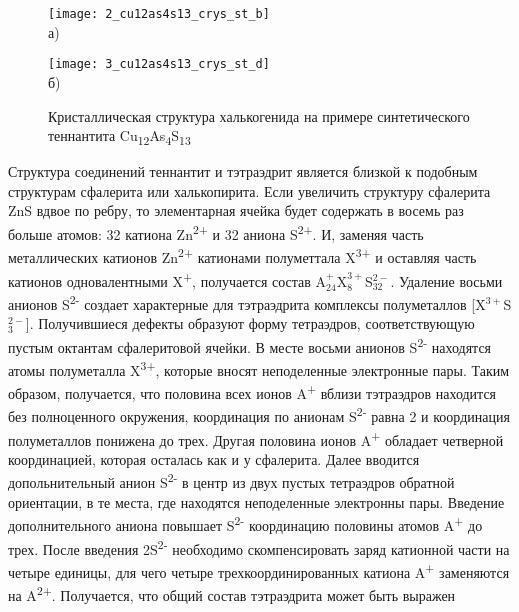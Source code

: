 \begin{figure}[pt!]
  \begin{minipage}[ht]{0.99\linewidth}\centering
    \texttt{[image: 2\_cu12as4s13\_crys\_st\_b]} \\ а)
  \end{minipage}
  \vfill
  \begin{minipage}[ht]{0.99\linewidth}\centering
    \texttt{[image: 3\_cu12as4s13\_crys\_st\_d]} \\ б)
  \end{minipage}

      \caption[Кристаллическая структура халькогенида на примере синтетического теннантита Cu\textsubscript{12}As\textsubscript{4}S\textsubscript{13}]{Кристаллическая структура халькогенида на примере синтетического теннантита Cu\textsubscript{12}As\textsubscript{4}S\textsubscript{13}}
    \label{img:figure1}
\end{figure}

Структура соединений теннантит и тэтраэдрит является близкой к  подобным структурам сфалерита или халькопирита\cite{Pauling1934}. 
Если увеличить структуру сфалерита ZnS вдвое по ребру, то элементарная ячейка будет содержать в восемь раз больше атомов: 32 катиона Zn\textsuperscript{2+} и 32 аниона S\textsuperscript{2+}. И, заменяя часть металлических катионов Zn\textsuperscript{2+} катионами полуметтала X\textsuperscript{3+} и оставляя часть катионов одновалентными X\textsuperscript{+}, получается состав A$^{+}_{24}$X$^{3+}_{8}$S$^{2-}_{32}$. Удаление восьми анионов S\textsuperscript{2-} создает характерные для тэтраэдрита комплексы полуметаллов [X$^{3+}$S$^{2-}_{3}$]. Получившиеся дефекты образуют форму тетраэдров, соответствующую пустым октантам сфалеритовой ячейки. В месте восьми анионов S\textsuperscript{2-} находятся атомы полуметалла  X\textsuperscript{3+}, которые вносят  неподеленные электронные пары. Таким образом, получается, что половина всех ионов A\textsuperscript{+} вблизи тэтраэдров находится без полноценного окружения, координация по анионам S\textsuperscript{2-} равна 2 и координация полуметаллов понижена до трех. Другая половина ионов A\textsuperscript{+} обладает четверной координацией, которая осталась как и у сфалерита. Далее вводится допольнительный анион S\textsuperscript{2-} в центр из двух пустых тетраэдров обратной ориентации, в те места, где находятся неподеленные электронны пары. Введение дополнительного аниона повышает S\textsuperscript{2-}  координацию половины атомов A\textsuperscript{+} до трех. После введения 2S\textsuperscript{2-} необходимо скомпенсировать заряд катионной части на четыре единицы, для чего четыре трехкоординированных катиона A\textsuperscript{+} заменяются на A\textsuperscript{2+}. Получается, что общий состав тэтраэдрита может быть выражен 

